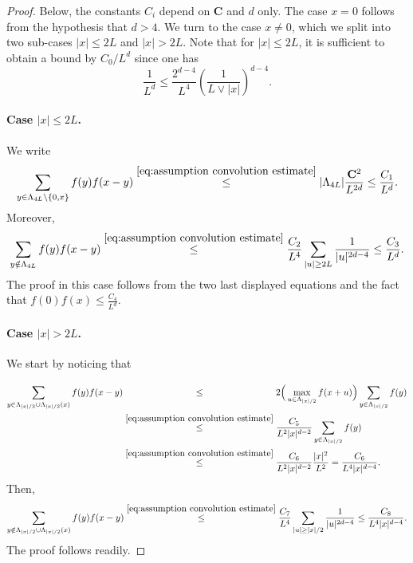 \documentclass[11pt,a4paper]{article}
\numberwithin{equation}{section}
\theoremstyle{plain}
\theoremstyle{definition}
\newcommand\bfC{\mathbf{C}}
\begin{document}
\begin{proof} Below, the constants $C_i$ depend on $\bfC$ and $d$ only. The case $x=0$ follows from the hypothesis that $d>4$. We turn to the case $x\neq 0$, which we split into two sub-cases $|x|\leq 2L$ and $|x|>2L$. Note that for $|x|\leq 2L$, it is sufficient to obtain a bound by $C_0/L^d$ since one has
\begin{equation}
	\frac{1}{L^d}\leq \frac{2^{d-4}}{L^4}\left(\frac{1}{L\vee |x|}\right)^{d-4}.
\end{equation}

\paragraph{Case $|x|\leq 2L$.} We write
\begin{equation}
	\sum_{y\in \Lambda_{4L}\setminus\{0,x\}}f(y)f(x-y)\stackrel{\eqref{eq:assumption convolution estimate}}\leq |\Lambda_{4L}|\frac{\bfC^2}{L^{2d}}\leq \frac{C_1}{L^d}.
\end{equation}
Moreover,
\begin{equation}
	\sum_{y\notin\Lambda_{4L}}f(y)f(x-y)\stackrel{\eqref{eq:assumption convolution estimate}}\leq \frac{C_2}{L^4}\sum_{|u|\geq 2L}\frac{1}{|u|^{2d-4}}\leq \frac{C_3}{L^d}.
\end{equation}
The proof in this case follows from the two last displayed equations and the fact that $f(0)f(x)\leq \tfrac{C_4}{L^d}$.
\paragraph{Case $|x|>2L$.} We start by noticing that
\begin{align}\notag
	\sum_{y\in \Lambda_{|x|/2}\cup \Lambda_{|x|/2}(x)}f(y)f(x-y)&\stackrel{\phantom{\eqref{eq:assumption convolution estimate}}}\leq {2\Big(\max_{u\in \Lambda_{|x|/2}}f(x+u)\Big)\sum_{y\in \Lambda_{|x|/2}}f(y)}
	\\&\stackrel{\eqref{eq:assumption convolution estimate}}\leq \frac{C_5}{L^2|x|^{d-2}}\sum_{y\in \Lambda_{|x|/2}}f(y)\notag
	\\&\stackrel{\eqref{eq:assumption convolution estimate}}\leq \frac{C_6}{L^2|x|^{d-2}}\frac{|x|^2}{L^2}=\frac{C_6}{L^4|x|^{d-4}}.
\end{align}
Then,
\begin{equation}
	\sum_{y\notin \Lambda_{|x|/2}\cup \Lambda_{|x|/2}(x)}f(y)f(x-y)\stackrel{\eqref{eq:assumption convolution estimate}}\leq \frac{C_7}{L^4}\sum_{|u|\geq|x|/2}\frac{1}{|u|^{2d-4}}\leq \frac{C_8}{L^4|x|^{d-4}}.
\end{equation}
The proof follows readily.
\end{proof}
\end{document}
